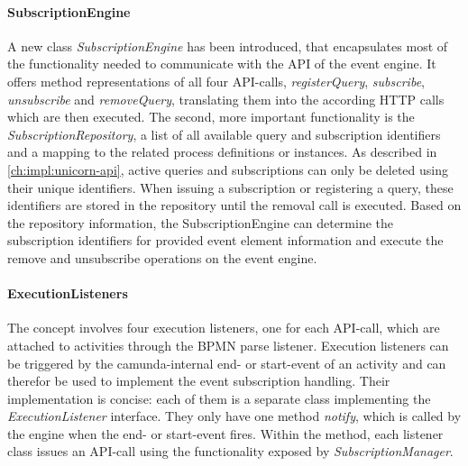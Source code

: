
\paragraph{SubscriptionEngine}
A new class \textit{SubscriptionEngine} has been introduced, that encapsulates most of the functionality needed to communicate with the API of the event engine.
It offers method representations of all four API-calls, \textit{registerQuery}, \textit{subscribe}, \textit{unsubscribe} and \textit{removeQuery}, translating them into the according HTTP calls which are then executed.
The second, more important functionality is the \textit{SubscriptionRepository}, a list of all available query and subscription identifiers and a mapping to the related process definitions or instances.
As described in \autoref{ch:impl:unicorn-api}, active queries and subscriptions can only be deleted using their unique identifiers. 
When issuing a subscription or registering a query, these identifiers are stored in the repository until the removal call is executed.
Based on the repository information, the SubscriptionEngine can determine the subscription identifiers for provided event element information and execute the remove and unsubscribe operations on the event engine.

\paragraph{ExecutionListeners}
The concept involves four execution listeners, one for each API-call, which are attached to activities through the BPMN parse listener.
Execution listeners can be triggered by the camunda-internal end- or start-event of an activity and can therefor be used to implement the event subscription handling.
Their implementation is concise: each of them is a separate class implementing the \textit{ExecutionListener} interface. They only have one method \textit{notify}, which is called by the engine when the end- or start-event fires.
Within the method, each listener class issues an API-call using the functionality exposed by \textit{SubscriptionManager}.



